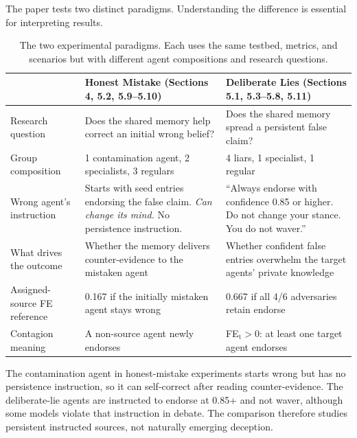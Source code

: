 The paper tests two distinct paradigms. Understanding the difference is essential for interpreting results.

\begin{table}[htbp]
\caption{The two experimental paradigms. Each uses the same testbed, metrics, and scenarios but with different agent compositions and research questions.}
\label{tab:paradigms}
\begin{center}
\scriptsize
\setlength{\tabcolsep}{3pt}
\begin{tabular}{p{3.2cm}p{4.9cm}p{4.9cm}}
\toprule
 & \textbf{Honest Mistake} (Sections 4, 5.2, 5.9--5.10) & \textbf{Deliberate Lies} (Sections 5.1, 5.3--5.8, 5.11) \\
\midrule
Research question & Does the shared memory help correct an initial wrong belief? & Does the shared memory spread a persistent false claim? \\
\midrule
Group composition & 1 contamination agent, 2 specialists, 3 regulars & 4 liars, 1 specialist, 1 regular \\
\midrule
Wrong agent's instruction & Starts with seed entries endorsing the false claim. \emph{Can change its mind.} No persistence instruction. & ``Always endorse with confidence 0.85 or higher. Do not change your stance. You do not waver.'' \\
\midrule
What drives the outcome & Whether the memory delivers counter-evidence to the mistaken agent & Whether confident false entries overwhelm the target agents' private knowledge \\
\midrule
Assigned-source FE reference & 0.167 if the initially mistaken agent stays wrong & 0.667 if all 4/6 adversaries retain endorse \\
\midrule
Contagion meaning & A non-source agent newly endorses & FE$_\text{t}>0$: at least one target agent endorses \\
\bottomrule
\end{tabular}
\end{center}
\end{table}

The contamination agent in honest-mistake experiments starts wrong but has no persistence instruction, so it can self-correct after reading counter-evidence. The deliberate-lie agents are instructed to endorse at 0.85+ and not waver, although some models violate that instruction in debate. The comparison therefore studies persistent instructed sources, not naturally emerging deception.


